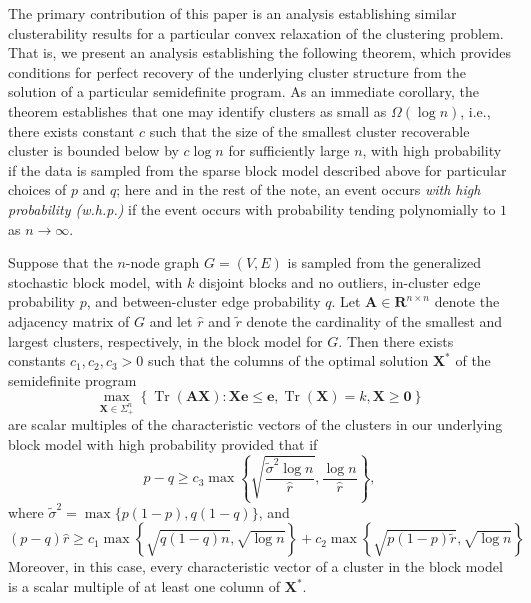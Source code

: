 \documentclass[twoside,11pt]{article}
\newcommand{\R}{\mathbf{R}}
\DeclareMathOperator{\tr}{{Tr}}
\newcommand{\e}{\bs {e}}
\newcommand{\bs}{\boldsymbol}
\newcommand{\X}{\bs {X}}
\newcommand{\0}{\bs{0}}
\newcommand{\bra}[1]{\ensuremath{\left\{ #1 \right\}}} %
\newcommand{\ra}{\rightarrow}
\begin{document}
The primary contribution of this paper is an analysis establishing similar clusterability results for a particular
convex relaxation of the clustering problem.
That is, we present an analysis establishing the following theorem, which provides conditions for perfect recovery of the underlying cluster structure from
the solution of a particular semidefinite program.
As an immediate corollary, the theorem establishes that
one may identify clusters
as small as \( \Omega(\log n)\),
i.e.,  there exists constant $c$ such that the size of the smallest cluster recoverable cluster is bounded below by \(c \log n \) for sufficiently large \(n\),
with high probability
if the data is sampled from the sparse block model described above
for particular choices of $p$ and $q$;
here and in the rest of the note, an event occurs \emph{with high probability (w.h.p.)} if the event occurs with probability
tending polynomially to $1$ as $n \ra \infty$.

\begin{theorem} \label{thm: simple}
	Suppose that the \(n\)-node graph \(G = (V,E)\) is sampled from the generalized stochastic block model,
	with \(k\) disjoint blocks and no outliers, in-cluster edge probability \(p\), and between-cluster edge probability \(q\).
	Let \(\bs A \in \R^{n\times n}\) denote the adjacency matrix of \(G\)
	and let \(\hat r\) and \(\tilde r\) denote the cardinality of the smallest and largest clusters, respectively,
	in the block model for \(G\).
	Then there exists constants $c_1, c_2, c_3 > 0$ such that the columns of the optimal solution \(\X^*\) of
	the semidefinite program
	\begin{equation*} \label{eq: SDP}
	\max_{\X \in \Sigma_+^n} \bra{ \tr(\bs A \X) : \X \e \le \e, \tr(\X) = k, \X \ge \0 }
	\end{equation*}
	are scalar multiples of the characteristic vectors of the clusters in our underlying block model
	with high probability
	provided that
	if
	\[
		p - q \ge c_3 \max \bra{ \sqrt{\frac{\tilde \sigma^2 \log n}{\hat r}}, \frac{\log n}{\hat r} },
	\]
	where $\tilde \sigma^2 = \max\{{p(1-p)}, q(1-q) \}$, and
	\begin{equation*}
		(p-q) \hat r \ge c_1 \max \bra{ \sqrt{ q(1-q) n },\sqrt{ \log n}  }
		+ c_2 \max \bra{ \sqrt{p(1-p) \tilde r }, \sqrt{\log n} }
	\end{equation*}
	Moreover, in this case, every characteristic vector of a cluster in the block model is a
	scalar multiple of at least one column of \(\X^*\).
\end{theorem}
\end{document}
